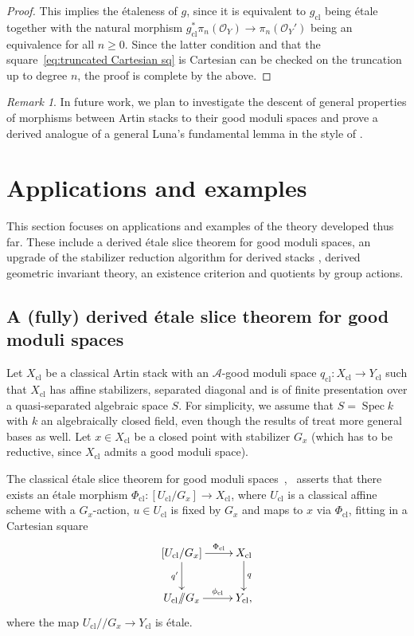 \documentclass[a4paper,twoside,11pt]{amsart}
\theoremstyle{plain}
\theoremstyle{definition}
\theoremstyle{remark}
\newtheorem{remark}[theorem]{Remark}
\numberwithin{equation}{section}
\newcommand\sA{\mathcal{A}}
\DeclareMathOperator{\Spec}{Spec} %
\newcommand{\cl}{\mathrm{cl}} %
\def\git{/\!\!/}
\newcommand{\oO}{\mathcal{O}}
\begin{document}
\begin{proof}
    This implies the \'{e}taleness of $g$, since it is equivalent to $g_\cl$ being \'{e}tale together with the natural morphism $g_\cl^\ast \pi_n(\oO_Y) \to \pi_n(\oO_Y')$ being an equivalence for all $n \geq 0$. Since the latter condition and that the square~\eqref{eq:truncated Cartesian sq} is Cartesian can be checked on the truncation up to degree $n$, the proof is complete by the above.
\end{proof}

\begin{remark}
    In future work, we plan to investigate the descent of general properties of morphisms between Artin stacks to their good moduli spaces and prove a derived analogue of a general Luna's fundamental lemma in the style of \cite[Theorem~A]{LunaRydh}. 
\end{remark}

\section{Applications and examples} \label{sec:4}

This section focuses on applications and examples of the theory developed thus far. These include a derived \'{e}tale slice theorem for good moduli spaces, an upgrade of the stabilizer reduction algorithm for derived stacks \cite{HRS}, derived geometric invariant theory, an existence criterion and quotients by group actions.

\subsection{A (fully) derived \'{e}tale slice theorem for good moduli spaces} Let $X_\cl$ be a classical Artin stack with an $\sA$-good moduli space $q_\cl \colon X_\cl \to Y_\cl$ such that $X_\cl$ has affine stabilizers, separated diagonal and is of finite presentation over a quasi-separated algebraic space $S$. For simplicity, we assume that $S=\Spec k$ with $k$ an algebraically closed field, even though the results of \cite{AHR2} treat more general bases as well. Let $x \in X_{\cl}$ be a closed point with stabilizer $G_x$ (which has to be reductive, since $X_\cl$ admits a good moduli space). 

The classical \'{e}tale slice theorem for good moduli spaces~\cite[Theorem~4.12]{AlperLuna},~\cite[Theorem~6.1]{AHR2} asserts that there exists an \'{e}tale morphism $\Phi_\cl \colon [U_\cl / G_x] \to X_\cl$, where $U_\cl$ is a classical affine scheme with a $G_x$-action, $u \in U_\cl$ is fixed by $G_x$ and maps to $x$ via $\Phi_\cl$, fitting in a Cartesian square
    \begin{align*}
        \xymatrix{
        [U_\cl / G_x] \ar[d]_-{q'} \ar[r]^-{\Phi_\cl} & X_\cl \ar[d]^-{q} \\
        U_\cl \git G_x \ar[r]^-{\phi_\cl} & Y_\cl,
        }
    \end{align*}
where the map $U_\cl \git G_x \to Y_\cl$ is \'{e}tale.
\end{document}
